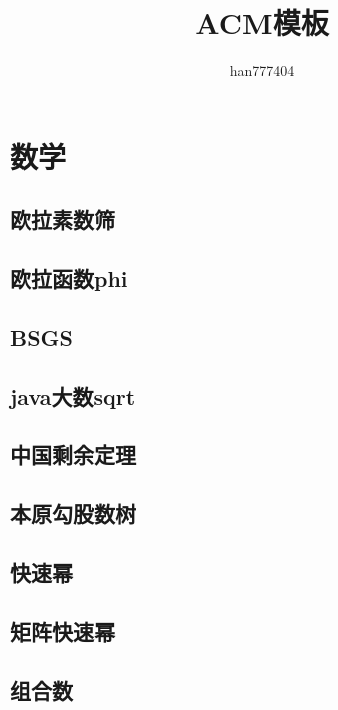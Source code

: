\documentclass[twocolumn,a4,twoside]{book}
\title{\CJKfamily{hei} {\bfseries ACM模板}}
\author{han777404}
\begin{document}
\small
	\pagestyle{empty}
	\begin{titlepage}
		\maketitle
	\end{titlepage}
	\tableofcontents
	\mainmatter
	\pagestyle{fancy}
	
	
	\chapter{数学}
		\section{欧拉素数筛}
		
		\section{欧拉函数phi}
		
		\section{BSGS}
		
		\section{java大数sqrt}
		
		\section{中国剩余定理}
		
		\section{本原勾股数树}
		
		\section{快速幂}
		
		\section{矩阵快速幂}
		
		\section{组合数}
		
\end{document}
